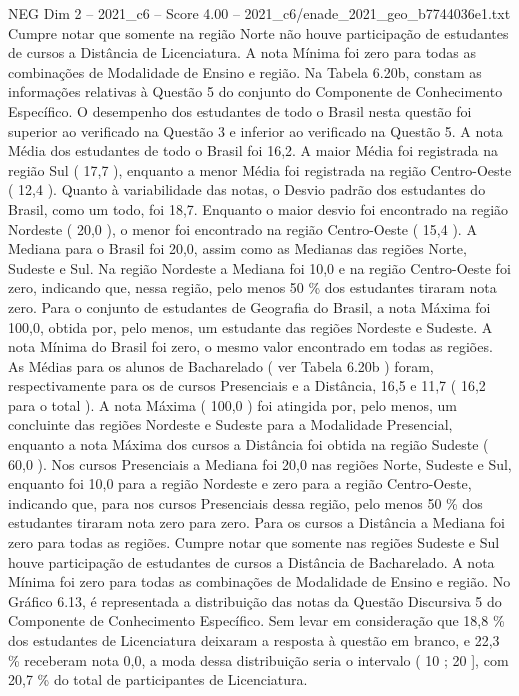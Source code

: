 \begin{textsample}{NEG Dim 2 – 2021\_c6 – Score 4.00 – 2021\_c6/enade\_2021\_geo\_b7744036e1.txt}
Cumpre notar que somente na região Norte não houve participação de estudantes de cursos a Distância de Licenciatura.
A nota Mínima foi zero para todas as combinações de Modalidade de Ensino e região.
Na Tabela 6.20b, constam as informações relativas à Questão 5 do conjunto do Componente de Conhecimento Específico.
O desempenho dos estudantes de todo o Brasil nesta questão foi superior ao verificado na Questão 3 e inferior ao verificado na Questão 5.
A nota Média dos estudantes de todo o Brasil foi 16,2.
A maior Média foi registrada na região Sul ( 17,7 ), enquanto a menor Média foi registrada na região Centro-Oeste ( 12,4 ).
Quanto à variabilidade das notas, o Desvio padrão dos estudantes do Brasil, como um todo, foi 18,7.
Enquanto o maior desvio foi encontrado na região Nordeste ( 20,0 ), o menor foi encontrado na região Centro-Oeste ( 15,4 ).
A Mediana para o Brasil foi 20,0, assim como as Medianas das regiões Norte, Sudeste e Sul.
Na região Nordeste a Mediana foi 10,0 e na região Centro-Oeste foi zero, indicando que, nessa região, pelo menos 50 \% dos estudantes tiraram nota zero.
Para o conjunto de estudantes de Geografia do Brasil, a nota Máxima foi 100,0, obtida por, pelo menos, um estudante das regiões Nordeste e Sudeste.
A nota Mínima do Brasil foi zero, o mesmo valor encontrado em todas as regiões.
As Médias para os alunos de Bacharelado ( ver Tabela 6.20b ) foram, respectivamente para os de cursos Presenciais e a Distância, 16,5 e 11,7 ( 16,2 para o total ).
A nota Máxima ( 100,0 ) foi atingida por, pelo menos, um concluinte das regiões Nordeste e Sudeste para a Modalidade Presencial, enquanto a nota Máxima dos cursos a Distância foi obtida na região Sudeste ( 60,0 ).
Nos cursos Presenciais a Mediana foi 20,0 nas regiões Norte, Sudeste e Sul, enquanto foi 10,0 para a região Nordeste e zero para a região Centro-Oeste, indicando que, para nos cursos Presenciais dessa região, pelo menos 50 \% dos estudantes tiraram nota zero para zero.
Para os cursos a Distância a Mediana foi zero para todas as regiões.
Cumpre notar que somente nas regiões Sudeste e Sul houve participação de estudantes de cursos a Distância de Bacharelado.
A nota Mínima foi zero para todas as combinações de Modalidade de Ensino e região.
No Gráfico 6.13, é representada a distribuição das notas da Questão Discursiva 5 do Componente de Conhecimento Específico.
Sem levar em consideração que 18,8 \% dos estudantes de Licenciatura deixaram a resposta à questão em branco, e 22,3 \% receberam nota 0,0, a moda dessa distribuição seria o intervalo ( 10 ; 20 ], com 20,7 \% do total de participantes de Licenciatura.

\end{textsample}
